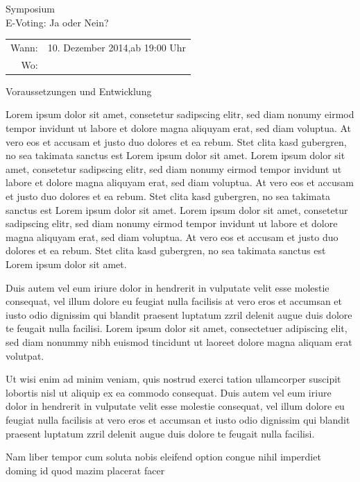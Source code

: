 \documentclass[10pt,a4paper]{article} %
\newcommand{\NewsItem}[1]{ %
\usefont{T1}{fvs}{n}{n} %
\vspace{24pt}\large #1\vspace{3pt} %
\par \normalsize \normalfont}
\begin{document}
\begin{multicols}{3}

\begin{invitationBox}{Symposium \\E-Voting: Ja oder Nein?}
\begin{tabular}{r p{4cm}}
Wann: & 10. Dezember 2014,\newline ab 19:00 Uhr \\
Wo: &  
\end{tabular}
\end{invitationBox}


\begin{flushleft}
\NewsItem{Voraussetzungen und Entwicklung}
\end{flushleft}
Lorem ipsum dolor sit amet, consetetur sadipscing elitr, sed diam nonumy eirmod tempor invidunt ut labore et dolore magna aliquyam erat, sed diam voluptua. At vero eos et accusam et justo duo dolores et ea rebum. Stet clita kasd gubergren, no sea takimata sanctus est Lorem ipsum dolor sit amet. Lorem ipsum dolor sit amet, consetetur sadipscing elitr, sed diam nonumy eirmod tempor invidunt ut labore et dolore magna aliquyam erat, sed diam voluptua. At vero eos et accusam et justo duo dolores et ea rebum. Stet clita kasd gubergren, no sea takimata sanctus est Lorem ipsum dolor sit amet. Lorem ipsum dolor sit amet, consetetur sadipscing elitr, sed diam nonumy eirmod tempor invidunt ut labore et dolore magna aliquyam erat, sed diam voluptua. At vero eos et accusam et justo duo dolores et ea rebum. Stet clita kasd gubergren, no sea takimata sanctus est Lorem ipsum dolor sit amet.   

Duis autem vel eum iriure dolor in hendrerit in vulputate velit esse molestie consequat, vel illum dolore eu feugiat nulla facilisis at vero eros et accumsan et iusto odio dignissim qui blandit praesent luptatum zzril delenit augue duis dolore te feugait nulla facilisi. Lorem ipsum dolor sit amet, consectetuer adipiscing elit, sed diam nonummy nibh euismod tincidunt ut laoreet dolore magna aliquam erat volutpat.   

Ut wisi enim ad minim veniam, quis nostrud exerci tation ullamcorper suscipit lobortis nisl ut aliquip ex ea commodo consequat. Duis autem vel eum iriure dolor in hendrerit in vulputate velit esse molestie consequat, vel illum dolore eu feugiat nulla facilisis at vero eros et accumsan et iusto odio dignissim qui blandit praesent luptatum zzril delenit augue duis dolore te feugait nulla facilisi.   

Nam liber tempor cum soluta nobis eleifend option congue nihil imperdiet doming id quod mazim placerat facer



\end{multicols} %
\end{document}
